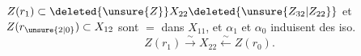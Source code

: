 
 $Z(r_1)\subset\deleted{\unsure{Z}} X_{22}\deleted{\unsure{Z_{32}|Z_{22}}}$ et $Z(r_{\unsure{2|0}})\subset X_{12}$ sont $=$  dans $X_{11}$, et $\alpha_1$ et $\alpha_0$ induisent des iso.
\[
Z(r_1)\xrightarrow{\sim}X_{22}\xleftarrow{\sim}Z(r_0).
\]

